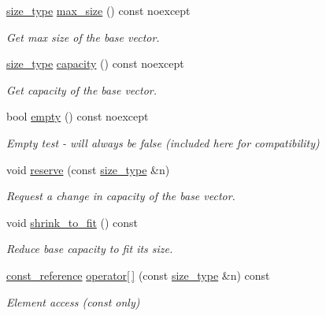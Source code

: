 \begin{DoxyCompactItemize}
\hyperlink{classIceBRG_1_1limit__vector_a81be3eb6cd519b3f5279ef735ccc4c2f}{size\+\_\+type} \hyperlink{classIceBRG_1_1limit__vector_a589edd5c2ab9c4a2c55af0081a8fb01e}{max\+\_\+size} () const  noexcept
\begin{DoxyCompactList}\small\item\em Get max size of the base vector. \end{DoxyCompactList}\item 
\hyperlink{classIceBRG_1_1limit__vector_a81be3eb6cd519b3f5279ef735ccc4c2f}{size\+\_\+type} \hyperlink{classIceBRG_1_1limit__vector_aa5e914c26779bab6daf66acb4c3de21a}{capacity} () const  noexcept
\begin{DoxyCompactList}\small\item\em Get capacity of the base vector. \end{DoxyCompactList}\item 
bool \hyperlink{classIceBRG_1_1limit__vector_aa0ca192c0495d25b2a7419bf2b4afaac}{empty} () const  noexcept
\begin{DoxyCompactList}\small\item\em Empty test -\/ will always be false (included here for compatibility) \end{DoxyCompactList}\item 
void \hyperlink{classIceBRG_1_1limit__vector_ad21b2f4f9e93bb508dba05f3f04c72ab}{reserve} (const \hyperlink{classIceBRG_1_1limit__vector_a81be3eb6cd519b3f5279ef735ccc4c2f}{size\+\_\+type} \&n)
\begin{DoxyCompactList}\small\item\em Request a change in capacity of the base vector. \end{DoxyCompactList}\item 
void \hyperlink{classIceBRG_1_1limit__vector_ac3ad1f9902e86e93b48e34502b7b65b6}{shrink\+\_\+to\+\_\+fit} () const 
\begin{DoxyCompactList}\small\item\em Reduce base capacity to fit its size. \end{DoxyCompactList}\item 
\hyperlink{classIceBRG_1_1limit__vector_aed6fc504d7987040be16d150089c7893}{const\+\_\+reference} \hyperlink{classIceBRG_1_1limit__vector_a6dc04a7b7340b2e8e0467e493698ea4b}{operator\mbox{[}$\,$\mbox{]}} (const \hyperlink{classIceBRG_1_1limit__vector_a81be3eb6cd519b3f5279ef735ccc4c2f}{size\+\_\+type} \&n) const 
\begin{DoxyCompactList}\small\item\em Element access (const only) \end{DoxyCompactList}\item 

\end{DoxyCompactItemize}
